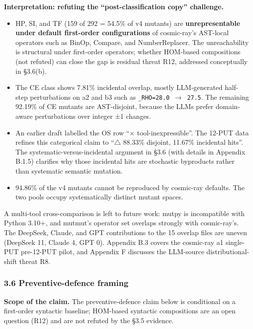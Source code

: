 \documentclass[review,12pt,authoryear]{elsarticle}
\providecommand{\tightlist}{\setlength{\itemsep}{0pt}\setlength{\parskip}{0pt}}
\begin{document}
\textbf{Interpretation: refuting the ``post-classification copy''
challenge.}

\begin{itemize}
\tightlist
\item
  HP, SI, and TF (159 of 292 = 54.5\% of v4 mutants) are
  \textbf{unrepresentable under default first-order configurations} of
  cosmic-ray's AST-local operators such as BinOp, Compare, and
  NumberReplacer. The unreachability is structural under first-order
  operators; whether HOM-based compositions \citep{jia2008subtle} (not
  refuted) can close the gap is residual threat R12, addressed
  conceptually in §3.6(b).
\item
  The CE class shows 7.81\% incidental overlap, mostly LLM-generated
  half-step perturbations on a2 and b3 such as
  \texttt{\_RHO=28.0\ $\to$\ 27.5}. The remaining 92.19\% of CE mutants are
  AST-disjoint, because the LLMs prefer domain-aware perturbations over
  integer ±1 changes.
\item
  An earlier draft labelled the OS row ``$\times$ tool-inexpressible''. The
  12-PUT data refines this categorical claim to ``$\bigtriangleup$ 88.33\% disjoint,
  11.67\% incidental hits''. The systematic-versus-incidental argument
  in §3.6 (with details in Appendix B.1.5) clarifies why those
  incidental hits are stochastic byproducts rather than systematic
  semantic mutation.
\item
  94.86\% of the v4 mutants cannot be reproduced by cosmic-ray defaults.
  The two pools occupy systematically distinct mutant spaces.
\end{itemize}

A multi-tool cross-comparison is left to future work: mutpy is incompatible
with Python 3.10+, and mutmut's operator set overlaps strongly with
cosmic-ray's. The DeepSeek, Claude, and GPT contributions to the 15
overlap files are uneven (DeepSeek 11, Claude 4, GPT 0). Appendix B.3
covers the cosmic-ray a1 single-PUT pre-12-PUT pilot, and Appendix F
discusses the LLM-source distributional-shift threat R8.

\subsubsection{3.6 Preventive-defence framing}\label{preventive-defence-framing}

\textbf{Scope of the claim.} The preventive-defence claim below is
conditional on a first-order syntactic baseline; HOM-based syntactic
compositions are an open question (R12) and are not refuted by the §3.5
evidence.
\end{document}
